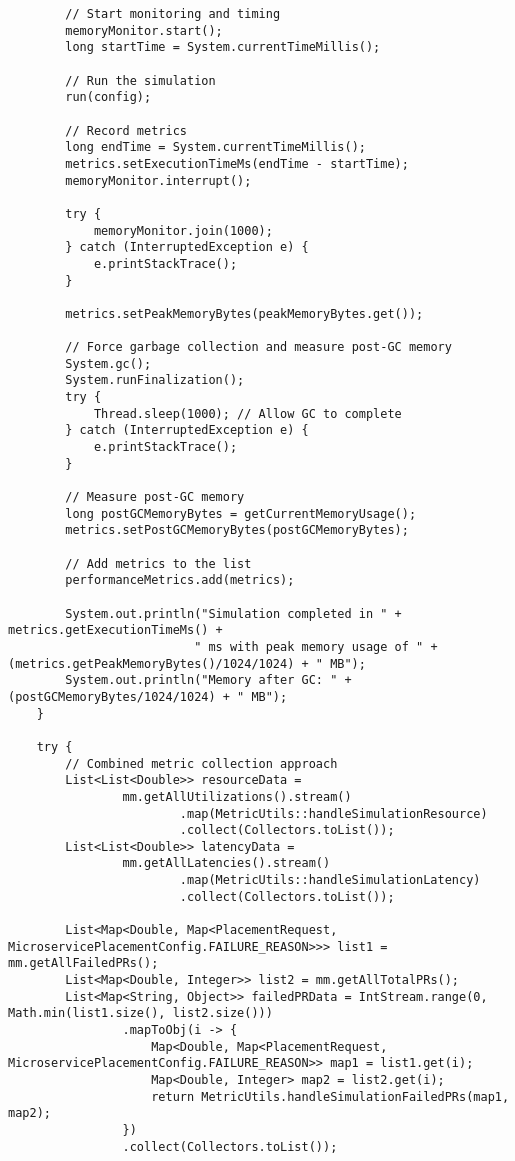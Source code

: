 \begin{verbatim}
        // Start monitoring and timing
        memoryMonitor.start();
        long startTime = System.currentTimeMillis();
        
        // Run the simulation
        run(config);
        
        // Record metrics
        long endTime = System.currentTimeMillis();
        metrics.setExecutionTimeMs(endTime - startTime);
        memoryMonitor.interrupt();
        
        try {
            memoryMonitor.join(1000);
        } catch (InterruptedException e) {
            e.printStackTrace();
        }
        
        metrics.setPeakMemoryBytes(peakMemoryBytes.get());
        
        // Force garbage collection and measure post-GC memory
        System.gc();
        System.runFinalization();
        try {
            Thread.sleep(1000); // Allow GC to complete
        } catch (InterruptedException e) {
            e.printStackTrace();
        }
        
        // Measure post-GC memory
        long postGCMemoryBytes = getCurrentMemoryUsage();
        metrics.setPostGCMemoryBytes(postGCMemoryBytes);
        
        // Add metrics to the list
        performanceMetrics.add(metrics);
        
        System.out.println("Simulation completed in " + metrics.getExecutionTimeMs() + 
                          " ms with peak memory usage of " + (metrics.getPeakMemoryBytes()/1024/1024) + " MB");
        System.out.println("Memory after GC: " + (postGCMemoryBytes/1024/1024) + " MB");
    }
    
    try {
        // Combined metric collection approach
        List<List<Double>> resourceData =
                mm.getAllUtilizations().stream()
                        .map(MetricUtils::handleSimulationResource)
                        .collect(Collectors.toList());
        List<List<Double>> latencyData =
                mm.getAllLatencies().stream()
                        .map(MetricUtils::handleSimulationLatency)
                        .collect(Collectors.toList());

        List<Map<Double, Map<PlacementRequest, MicroservicePlacementConfig.FAILURE_REASON>>> list1 = mm.getAllFailedPRs();
        List<Map<Double, Integer>> list2 = mm.getAllTotalPRs();
        List<Map<String, Object>> failedPRData = IntStream.range(0, Math.min(list1.size(), list2.size()))
                .mapToObj(i -> {
                    Map<Double, Map<PlacementRequest, MicroservicePlacementConfig.FAILURE_REASON>> map1 = list1.get(i);
                    Map<Double, Integer> map2 = list2.get(i);
                    return MetricUtils.handleSimulationFailedPRs(map1, map2);
                })
                .collect(Collectors.toList());


\end{verbatim}
